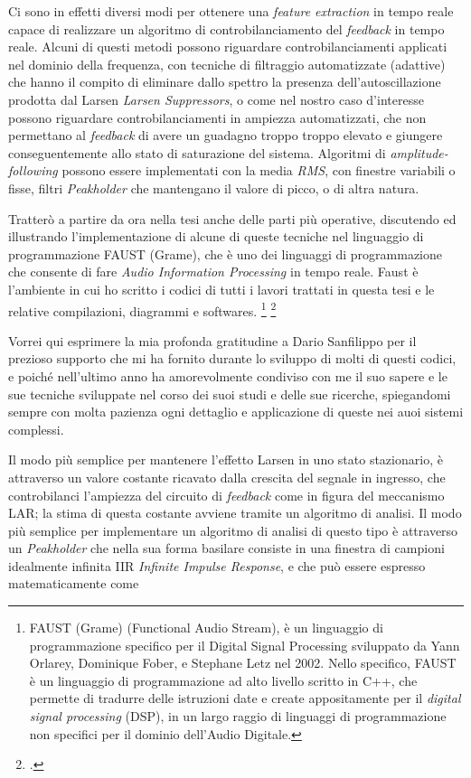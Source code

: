 Ci sono in effetti diversi modi per ottenere una \textit{feature extraction} 
in tempo reale capace di realizzare un algoritmo di controbilanciamento 
del \emph{feedback} in tempo reale.
Alcuni di questi metodi possono riguardare controbilanciamenti 
applicati nel dominio della frequenza,
con tecniche di filtraggio automatizzate (adattive) che
hanno il compito di eliminare dallo spettro la presenza dell'autoscillazione prodotta dal Larsen \textit{Larsen Suppressors},
o come nel nostro caso d’interesse possono riguardare controbilanciamenti in ampiezza
automatizzati, che non permettano al \emph{feedback} di avere un guadagno troppo troppo elevato 
e giungere conseguentemente allo stato di saturazione del sistema.
Algoritmi di \textit{amplitude-following} possono essere implementati 
con la media \textit{RMS}, con finestre variabili o fisse, 
filtri \textit{Peakholder} che mantengano il valore di picco, o di altra natura.

Tratterò a partire da ora nella tesi anche delle parti più operative, 
discutendo ed illustrando l'implementazione
di alcune di queste tecniche nel linguaggio di programmazione FAUST (Grame), 
che è uno dei linguaggi di programmazione
che consente di fare \textit{Audio Information Processing} in tempo reale.
Faust è l'ambiente in cui ho scritto i codici di tutti i lavori trattati
in questa tesi e le relative compilazioni, diagrammi e softwares.
\footnote{FAUST (Grame) (Functional Audio Stream), 
è un linguaggio di programmazione specifico per il Digital Signal
Processing sviluppato da Yann Orlarey, Dominique Fober, e Stephane Letz nel
2002. Nello specifico, FAUST è un linguaggio di programmazione ad alto livello
scritto in C++, che permette di tradurre delle istruzioni date e create 
appositamente per il \emph{digital signal processing} (DSP), in un largo raggio di linguaggi
di programmazione non specifici per il dominio dell’Audio Digitale.} \footcite{https://faust.grame.fr/} 

Vorrei qui esprimere la mia profonda gratitudine a 
Dario Sanfilippo per il prezioso supporto che mi ha fornito durante 
lo sviluppo di molti di questi codici,
e poiché nell'ultimo anno ha amorevolmente condiviso con me il suo sapere e le sue tecniche 
sviluppate nel corso dei suoi studi e delle sue ricerche, 
spiegandomi sempre con molta pazienza ogni dettaglio e applicazione 
di queste nei auoi sistemi complessi.

Il modo più semplice per mantenere l’effetto Larsen in uno stato stazionario, è attraverso un
valore costante ricavato dalla crescita del segnale in ingresso,
che controbilanci l’ampiezza del circuito di \emph{feedback} come in figura del meccanismo LAR;
la stima di questa costante avviene tramite un algoritmo di analisi.
Il modo più semplice per implementare un algoritmo di analisi di questo tipo
è attraverso un \textit{Peakholder} che nella sua forma basilare consiste in una finestra 
di campioni idealmente infinita IIR \textit{Infinite Impulse Response},
e che può essere espresso matematicamente come

